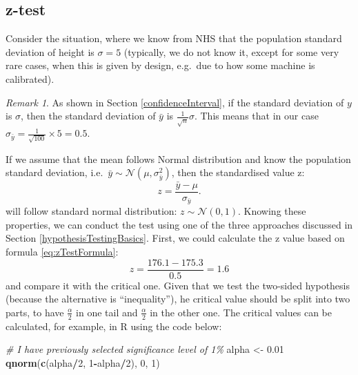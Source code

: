 \documentclass[
]{book}
\newenvironment{Shaded}{\begin{snugshade}}{\end{snugshade}}
\newcommand{\CommentTok}[1]{\textcolor[rgb]{0.56,0.35,0.01}{\textit{#1}}}
\newcommand{\DecValTok}[1]{\textcolor[rgb]{0.00,0.00,0.81}{#1}}
\newcommand{\FloatTok}[1]{\textcolor[rgb]{0.00,0.00,0.81}{#1}}
\newcommand{\FunctionTok}[1]{\textcolor[rgb]{0.13,0.29,0.53}{\textbf{#1}}}
\newcommand{\NormalTok}[1]{#1}
\newcommand{\OtherTok}[1]{\textcolor[rgb]{0.56,0.35,0.01}{#1}}
\newcommand{\SpecialCharTok}[1]{\textcolor[rgb]{0.81,0.36,0.00}{\textbf{#1}}}
\theoremstyle{definition}
\theoremstyle{definition}
\theoremstyle{definition}
\theoremstyle{definition}
\theoremstyle{remark}
\newtheorem*{remark}{Remark}
\begin{document}
\subsection{z-test}\label{statisticalTestsOneSampleMeanZ}

Consider the situation, where we know from NHS that the population standard deviation of height is \(\sigma=5\) (typically, we do not know it, except for some very rare cases, when this is given by design, e.g.~due to how some machine is calibrated).

\begin{remark}
As shown in Section \ref{confidenceInterval}, if the standard deviation of \(y\) is \(\sigma\), then the standard deviation of \(\bar{y}\) is \(\frac{1}{\sqrt{n}} \sigma\). This means that in our case \(\sigma_{\bar{y}}=\frac{1}{\sqrt{100}} \times 5 =0.5\).
\end{remark}

If we assume that the mean follows Normal distribution and know the population standard deviation, i.e.~\(\bar{y} \sim \mathcal{N}\left(\mu, \sigma^2_{\bar{y}}\right)\), then the standardised value z:
\begin{equation}
    z = \frac{\bar{y}-\mu}{\sigma_{\bar{y}}} .
    \label{eq:zTestFormula}
\end{equation}
will follow standard normal distribution: \(z \sim \mathcal{N}\left(0, 1\right)\). Knowing these properties, we can conduct the test using one of the three approaches discussed in Section \ref{hypothesisTestingBasics}. First, we could calculate the z value based on formula \eqref{eq:zTestFormula}:
\begin{equation*}
    z = \frac{176.1 -175.3}{0.5} = 1.6 
\end{equation*}
and compare it with the critical one. Given that we test the two-sided hypothesis (because the alternative is ``inequality''), he critical value should be split into two parts, to have \(\frac{\alpha}{2}\) in one tail and \(\frac{\alpha}{2}\) in the other one. The critical values can be calculated, for example, in R using the code below:

\begin{Shaded}
\begin{Highlighting}[]
\CommentTok{\# I have previously selected significance level of 1\%}
\NormalTok{alpha }\OtherTok{\textless{}{-}} \FloatTok{0.01}
\FunctionTok{qnorm}\NormalTok{(}\FunctionTok{c}\NormalTok{(alpha}\SpecialCharTok{/}\DecValTok{2}\NormalTok{, }\DecValTok{1}\SpecialCharTok{{-}}\NormalTok{alpha}\SpecialCharTok{/}\DecValTok{2}\NormalTok{), }\DecValTok{0}\NormalTok{, }\DecValTok{1}\NormalTok{)}
\end{Highlighting}
\end{Shaded}
\end{document}
